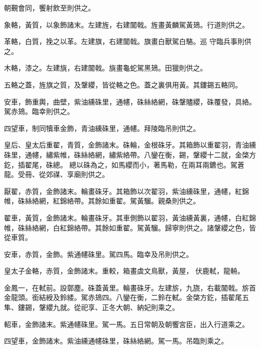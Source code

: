 \begin{pinyinscope}
 朝覲會同，饗射飲至則供之。



 象輅，黃質，以象飾諸末。左建旌，右建闟戟。旌畫黃麟駕黃鳷。行道則供之。



 革輅，白質，挽之以革。左建旗，右建闟戟。旗畫白獸駕白駱。巡
 守臨兵事則供之。



 木輅，漆之。左建旐，右建闟戟。旐畫龜蛇駕黑鳷。田獵則供之。



 五輅之蓋，旌旗之質，及鞶纓，皆從輅之色。蓋之裏俱用黃。其鏤錫五輅同。



 安車，飾重輿，曲壁，紫油纁硃里，通幰，硃絲絡網，硃鞶贐纓，硃覆發，具絡。駕赤鳷。臨幸則供之。



 四望車，制同犢車金飾，青油纁硃里，通幰。拜陵臨吊則供之。



 皇后、皇太后重翟，青質，金飾諸末。硃輪，金根硃牙。其箱飾以重翟羽，青油纁硃里，通幰，繡紫帷，硃絲絡網，繡紫絡帶。八鑾在衡，錫，鞶纓十二就，金棨方釳，插翟尾，硃總。
 總以硃為之，如馬纓而小，著馬勒，在兩耳兩鑣也。駕蒼龍。受冊、從郊禖、享廟則供之。



 厭翟，赤質，金飾諸末。輪畫硃牙。其箱飾以次翟羽，紫油纁硃里，通幰，紅錦帷，硃絲絡網，紅錦絡帶。其餘如重翟。駕黃騮。親桑則供之。



 翟車，黃質，金飾諸末。輪畫硃牙。其車側飾以翟羽，黃油纁黃裏，通幰，白紅錦帷，硃絲絡網，白紅錦絡帶。其餘如重翟。駕黃騮。歸寧則供之。諸鞶纓之色，皆從車質。



 安車，赤質，金飾。紫通幰硃里。駕四馬。臨幸及吊則供之。



 皇太子金輅，赤質，金飾諸末。重較，箱畫虡文鳥獸，黃屋，
 伏鹿軾，龍輈。



 金鳳一，在軾前。設鄣塵。硃蓋黃里。輪畫硃牙。左建旂，九旒，右載闟戟。旂首金龍頭。銜結綬及鈴緌。駕赤鳷四。八鑾在衡，二鈴在軾。金棨方釳，插翟尾五隼、鏤錫，鞶纓九就。從祀享、正冬大朝、納妃則乘之。



 軺車，金飾諸末。紫通幰硃里。駕一馬。五日常朝及朝饗宮臣，出入行道乘之。



 四望車，金飾諸末。紫油纁通幰硃里，硃絲絡網。駕一馬。吊臨則乘之。




\end{pinyinscope}
